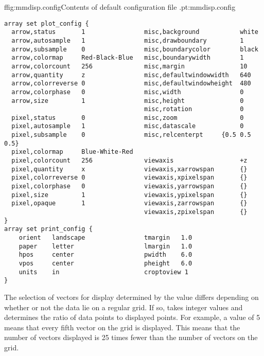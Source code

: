 \begin{codelisting}{f}{fig:mmdisp.config}{Contents of default configuration
file .}{pt:mmdisp.config}
\begin{verbatim}
array set plot_config {
  arrow,status       1                misc,background           white
  arrow,autosample   1                misc,drawboundary         1
  arrow,subsample    0                misc,boundarycolor        black
  arrow,colormap     Red-Black-Blue   misc,boundarywidth        1
  arrow,colorcount   256              misc,margin               10
  arrow,quantity     z                misc,defaultwindowwidth   640
  arrow,colorreverse 0                misc,defaultwindowheight  480
  arrow,colorphase   0                misc,width                0
  arrow,size         1                misc,height               0
                                      misc,rotation             0
  pixel,status       0                misc,zoom                 0
  pixel,autosample   1                misc,datascale            0
  pixel,subsample    0                misc,relcenterpt     {0.5 0.5 0.5}
  pixel,colormap     Blue-White-Red
  pixel,colorcount   256              viewaxis                  +z
  pixel,quantity     x                viewaxis,xarrowspan       {}
  pixel,colorreverse 0                viewaxis,xpixelspan       {}
  pixel,colorphase   0                viewaxis,yarrowspan       {}
  pixel,size         1                viewaxis,ypixelspan       {}
  pixel,opaque       1                viewaxis,zarrowspan       {}
                                      viewaxis,zpixelspan       {}
}
array set print_config {
    orient   landscape                tmargin   1.0
    paper    letter                   lmargin   1.0
    hpos     center                   pwidth    6.0
    vpos     center                   pheight   6.0
    units    in                       croptoview 1
}
\end{verbatim}
\end{codelisting}


The selection of vectors for display determined by the
 value differs depending on whether or not the data
lie on a regular grid.  If so,  takes integer
values and determines the ratio of data points to displayed points.  For
example, a value of 5 means that every fifth vector on the grid is
displayed.  This means that the number of vectors displayed is 25 times
fewer than the number of vectors on the grid.

